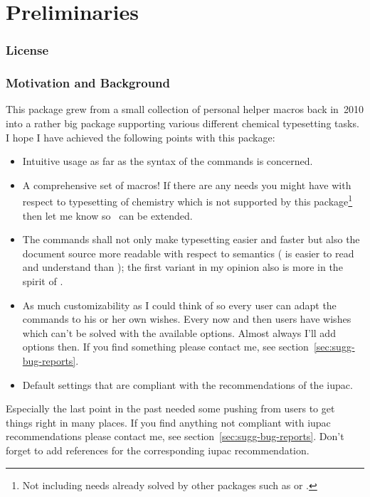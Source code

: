 \documentclass{chemmacros-manual}
\begin{document}
\part{Preliminaries}
\section{License}\label{sec:licence-requ-readme}
\license

\section{Motivation and Background}\label{sec:motiv-backgr}
This package grew from a small collection of personal helper macros back
in~2010 into a rather big package supporting various different chemical
typesetting tasks.  I hope I have achieved the following points with this
package:
\begin{itemize}
  \item Intuitive usage as far as the syntax of the commands is concerned.
  \item A comprehensive set of macros! If there are any needs you might have
    with respect to typesetting of chemistry which is not supported by this
    package\footnote{Not including needs already solved by other packages such
      as  or .} then let me know so \chemmacros\ can
    be extended.
  \item The commands shall not only make typesetting easier and faster but
    also the document source more readable with respect to semantics
    ( is easier to read and understand than
    ); the first variant in my
    opinion also is more in the spirit of \LaTeXe.
  \item As much customizability as I could think of so every user can adapt
    the commands to his or her own wishes.  Every now and then users have
    wishes which can't be solved with the available options.  Almost always
    I'll add options then.  If you find something please contact me, see
    section~\vref{sec:sugg-bug-reports}.
  \item Default settings that are compliant with the recommendations of the
    \acf{iupac}.
\end{itemize}
Especially the last point in the past needed some pushing from users to get
things right in many places.  If you find anything not compliant with
\ac{iupac} recommendations please contact me, see
section~\vref{sec:sugg-bug-reports}.  Don't forget to add references for the
corresponding \ac{iupac} recommendation.
\end{document}
